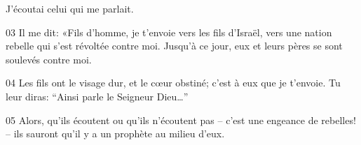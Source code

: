 J’écoutai celui qui me parlait.

03 Il me dit: «Fils d’homme, je t’envoie vers les fils d’Israël, vers une nation rebelle qui s’est révoltée contre moi. Jusqu’à ce jour, eux et leurs pères se sont soulevés contre moi.

04 Les fils ont le visage dur, et le cœur obstiné; c’est à eux que je t’envoie. Tu leur diras: “Ainsi parle le Seigneur Dieu…”

05 Alors, qu’ils écoutent ou qu’ils n’écoutent pas – c’est une engeance de rebelles! – ils sauront qu’il y a un prophète au milieu d’eux.
